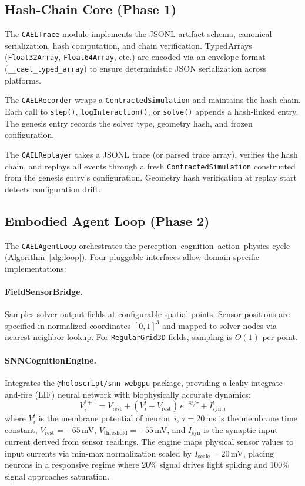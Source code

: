 \documentclass[sigconf,nonacm]{acmart}
\begin{document}
\subsection{Hash-Chain Core (Phase 1)}

The \texttt{CAELTrace} module implements the JSONL artifact schema,
canonical serialization, hash computation, and chain verification.
TypedArrays (\texttt{Float32Array}, \texttt{Float64Array}, etc.)
are encoded via an envelope format (\texttt{\_\_cael\_typed\_array})
to ensure deterministic JSON serialization across platforms.

The \texttt{CAELRecorder} wraps a \texttt{ContractedSimulation}
and maintains the hash chain. Each call to \texttt{step()},
\texttt{logInteraction()}, or \texttt{solve()} appends a
hash-linked entry. The genesis entry records the solver type,
geometry hash, and frozen configuration.

The \texttt{CAELReplayer} takes a JSONL trace (or parsed trace
array), verifies the hash chain, and replays all events through
a fresh \texttt{ContractedSimulation} constructed from the genesis
entry's configuration. Geometry hash verification at replay
start detects configuration drift.

\subsection{Embodied Agent Loop (Phase 2)}

The \texttt{CAELAgentLoop} orchestrates the
perception--cognition--action--physics cycle
(Algorithm~\ref{alg:loop}). Four pluggable interfaces allow
domain-specific implementations:

\paragraph{FieldSensorBridge.}
Samples solver output fields at configurable spatial points.
Sensor positions are specified in normalized coordinates $[0,1]^3$
and mapped to solver nodes via nearest-neighbor lookup. For
\texttt{RegularGrid3D} fields, sampling is $O(1)$ per point.

\paragraph{SNNCognitionEngine.}
Integrates the \texttt{@holoscript/snn-webgpu} package, providing
a leaky integrate-and-fire (LIF) neural network with biophysically
accurate dynamics:
\begin{equation}
V_{i}^{t+1} = V_{\text{rest}} + (V_i^t - V_{\text{rest}})\,
  e^{-\delta t / \tau} + I_{\text{syn},i}^t
\end{equation}
where $V_i^t$ is the membrane potential of neuron~$i$, $\tau = 20$\,ms
is the membrane time constant, $V_{\text{rest}} = -65$\,mV,
$V_{\text{threshold}} = -55$\,mV, and $I_{\text{syn}}$ is the
synaptic input current derived from sensor readings. The engine
maps physical sensor values to input currents via min-max
normalization scaled by $I_{\text{scale}} = 20$\,mV, placing
neurons in a responsive regime where 20\% signal drives light
spiking and 100\% signal approaches saturation.
\end{document}
